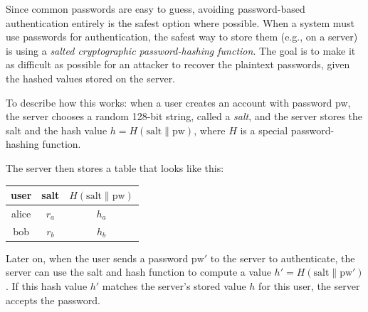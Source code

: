 \documentclass[
  letterpaper,
]{scrbook}
\newcounter{none} %
\theoremstyle{definition}
\theoremstyle{plain}
\theoremstyle{plain}
\theoremstyle{remark}
\begin{document}
Since common passwords are easy to guess, avoiding password-based
authentication entirely is the safest option where possible. When a
system must use passwords for authentication, the safest way to store
them (e.g., on a server) is using a \emph{salted cryptographic
password-hashing function}. The goal is to make it as difficult as
possible for an attacker to recover the plaintext passwords, given the
hashed values stored on the server.

To describe how this works: when a user creates an account with password
pw, the server chooses a random 128-bit string, called a \emph{salt},
and the server stores the salt and the hash value
\(h=H(\text{salt}\|\text{pw})\), where \(H\) is a special
password-hashing function.

The server then stores a table that looks like this:


{\def\LTcaptype{none} %
\begin{longtable}[]{@{}ccc@{}}
\toprule\noalign{}
user & salt & \(H(\text{salt}\|\text{pw})\) \\
\midrule\noalign{}
\endhead
\bottomrule\noalign{}
\endlastfoot
alice & \(r_a\) & \(h_a\) \\
bob & \(r_b\) & \(h_b\) \\
\end{longtable}
}

Later on, when the user sends a password \(\text{pw}'\) to the server to
authenticate, the server can use the salt and hash function to compute a
value \(h' = H(\text{salt}\|\text{pw}')\). If this hash value \(h'\)
matches the server's stored value \(h\) for this user, the server
accepts the password.
\end{document}
